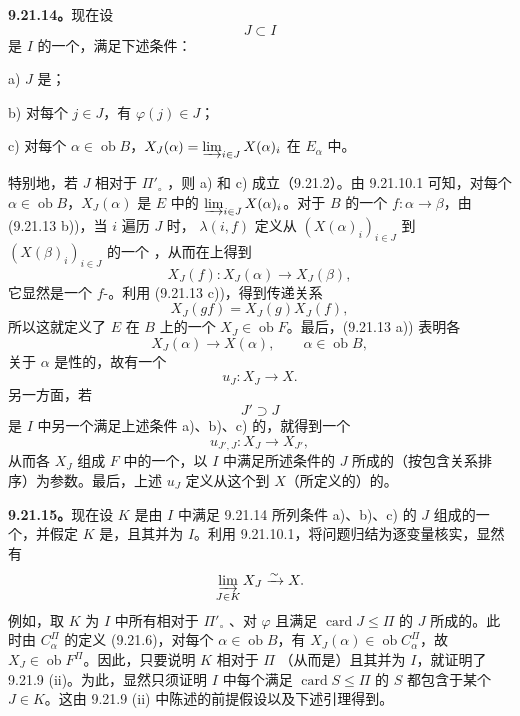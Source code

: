 \textbf{9.21.14。}现在设
\[
J\subset I
\]
是 $I$ 的一个，满足下述条件：

a) $J$ 是；

b) 对每个 $j\in J$，有 $\varphi(j)\in J$；

c) 对每个 $\alpha\in\operatorname{ob}B$，$X_J(\alpha)=\varinjlim_{i\in J}X(\alpha)_i$ 在 $E_\alpha$ 中。

特别地，若 $J$ 相对于 $\Pi'_\circ$ ，则 a) 和 c) 成立（9.21.2）。由 9.21.10.1 可知，对每个 $\alpha\in\operatorname{ob}B$，$X_J(\alpha)$ 是 $E$ 中的 $\varinjlim_{i\in J}X(\alpha)_i$。对于 $B$ 的一个 $f:\alpha\to\beta$，由 (9.21.13 b))，当 $i$ 遍历 $J$ 时， $\lambda(i,f)$ 定义从 $(X(\alpha)_i)_{i\in J}$ 到 $(X(\beta)_i)_{i\in J}$ 的一个 ，从而在上得到
\[
X_J(f):X_J(\alpha)\longrightarrow X_J(\beta),
\]
它显然是一个 $f$-。利用 (9.21.13 c))，得到传递关系
\[
X_J(gf)=X_J(g)X_J(f),
\]
所以这就定义了 $E$ 在 $B$ 上的一个 $X_J\in\operatorname{ob}F$。最后，(9.21.13 a)) 表明各
\[
X_J(\alpha)\longrightarrow X(\alpha),\qquad\alpha\in\operatorname{ob}B,
\]
关于 $\alpha$ 是性的，故有一个
\[
u_J:X_J\longrightarrow X.
\]
另一方面，若
\[
J'\supset J
\]
是 $I$ 中另一个满足上述条件 a)、b)、c) 的，就得到一个
\[
u_{J',J}:X_J\longrightarrow X_{J'},
\]
从而各 $X_J$ 组成 $F$ 中的一个，以 $I$ 中满足所述条件的 $J$ 所成的（按包含关系排序）为参数。最后，上述 $u_J$ 定义从这个到 $X$（所定义的）的。

\textbf{9.21.15。}现在设 $K$ 是由 $I$ 中满足 9.21.14 所列条件 a)、b)、c) 的 $J$ 组成的一个，并假定 $K$ 是，且其并为 $I$。利用 9.21.10.1，将问题归结为逐变量核实，显然有
\[
\varinjlim_{J\in K}X_J\xrightarrow{\sim}X.
\]
例如，取 $K$ 为 $I$ 中所有相对于 $\Pi'_\circ$ 、对 $\varphi$ 且满足 $\operatorname{card}J\leq\Pi$ 的 $J$ 所成的。此时由 $C_\alpha^\Pi$ 的定义 (9.21.6)，对每个 $\alpha\in\operatorname{ob}B$，有 $X_J(\alpha)\in\operatorname{ob}C_\alpha^\Pi$，故 $X_J\in\operatorname{ob}F^\Pi$。因此，只要说明 $K$ 相对于 $\Pi$ （从而是）且其并为 $I$，就证明了 9.21.9 (ii)。为此，显然只须证明 $I$ 中每个满足 $\operatorname{card}S\leq\Pi$ 的 $S$ 都包含于某个 $J\in K$。这由 9.21.9 (ii) 中陈述的前提假设以及下述引理得到。

